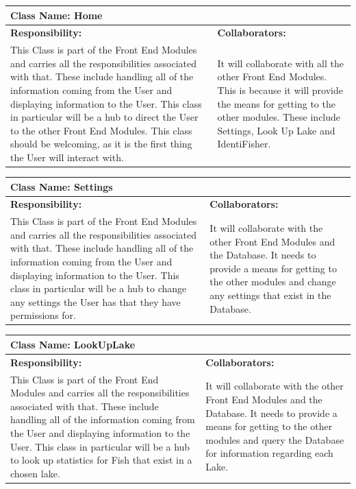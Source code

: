 \documentclass[]{article}
\begin{document}
	\begin{table}[ht]
		\centering
		\begin{tabular}{|p{5cm}|p{5cm}|}
		\hline
		 \multicolumn{2}{|l|}{\textbf{Class Name: Home}} \\
		\hline
		\textbf{Responsibility:} & \textbf{Collaborators:} \\ \hline
		 This Class is part of the Front End Modules and carries all the responsibilities associated with that. These include handling all of the information coming from the User and displaying information to the User. This class in particular will be a hub to direct the User to the other Front End Modules. This class should be welcoming, as it is the first thing the User will interact with.& It will collaborate with all the other Front End Modules. This is because it will provide the means for getting to the other modules. These include Settings, Look Up Lake and IdentiFisher. \\
		\hline
		\end{tabular}
	\end{table}

	\begin{table}[ht]
		\centering
		\begin{tabular}{|p{5cm}|p{5cm}|}
		\hline
		 \multicolumn{2}{|l|}{\textbf{Class Name: Settings}} \\
		\hline
		\textbf{Responsibility:} & \textbf{Collaborators:} \\ \hline
		 This Class is part of the Front End Modules and carries all the responsibilities associated with that. These include handling all of the information coming from the User and displaying information to the User. This class in particular will be a hub to change any settings the User has that they have permissions for. & It will collaborate with the other Front End Modules and the Database. It needs to provide a means for getting to the other modules and change any settings that exist in the Database. \\
		\hline
		\end{tabular}
	\end{table}

	\begin{table}[ht]
		\centering
		\begin{tabular}{| p{5cm} | p{5cm} |}
		\hline
		 \multicolumn{2}{|l|}{\textbf{Class Name: LookUpLake}} \\
		\hline
		\textbf{Responsibility:} & \textbf{Collaborators:} \\ \hline
		This Class is part of the Front End Modules and carries all the responsibilities associated with that. These include handling all of the information coming from the User and displaying information to the User. This class in particular will be a hub to look up statistics for Fish that exist in a chosen lake. & It will collaborate with the other Front End Modules and the Database. It needs to provide a means for getting to the other modules and query the Database for information regarding each Lake. \\
		\hline
		\end{tabular}
	\end{table}
\end{document}
